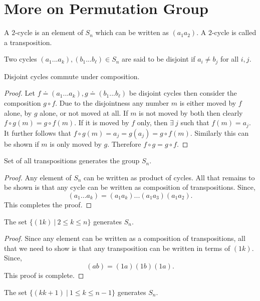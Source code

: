 \section{More on Permutation Group}
\begin{definition}
  A $2$-cycle is an element of $S_n$ which can be written as $(a_1a_2)$. A $2$-cycle is called a transposition.
\end{definition}
\begin{definition}
  Two cycles $(a_1...a_k), (b_1...b_\ell)\in S_n$ are said to be disjoint if $a_i \neq b_j$ for all $i,j$.
\end{definition}
\begin{proposition}
  Disjoint cycles commute under composition.
\end{proposition}
\begin{proof}
  Let $f \doteq (a_1...a_k), g\doteq (b_1...b_\ell)$ be disjoint cycles then consider the composition $g\circ f$. Due to the disjointness any number $m$ is either moved by $f$ alone, by $g$ alone, or not moved at all. If $m$ is not moved by both then clearly $f\circ g(m) = g\circ f(m)$. If it is moved by $f$ only, then $\exists\ j$ such that $f(m) = a_j$. It further follows that $f\circ g(m) = a_j = g(a_j) = g\circ f(m)$. Similarly this can be shown if $m$ is only moved by $g$. Therefore $f\circ g = g\circ f$.
\end{proof}
\begin{proposition}
  Set of all transpositions generates the group $S_n$.
\end{proposition}
\begin{proof}
  Any element of $S_n$ can be written as product of cycles. All that remains to be shown is that any cycle can be written as composition of transpositions. Since,
  \[(a_1...a_k) = (a_1a_k)...(a_1a_3)(a_1a_2).\]
  This completes the proof.
\end{proof}
\begin{proposition}
  The set $\{(1k)\ |\ 2\leq k\leq n\}$ generates $S_n$.
\end{proposition}
\begin{proof}
  Since any element can be written as a composition of transpositions, all that we need to show is that any transposition can be written in terms of $(1k)$. Since,
  \[(ab) = (1a)(1b)(1a).\]
  This proof is complete.
\end{proof}
\begin{proposition}
  The set $\{(kk+1)\ |\ 1\leq k\leq n-1\}$ generates $S_n$.
\end{proposition}
